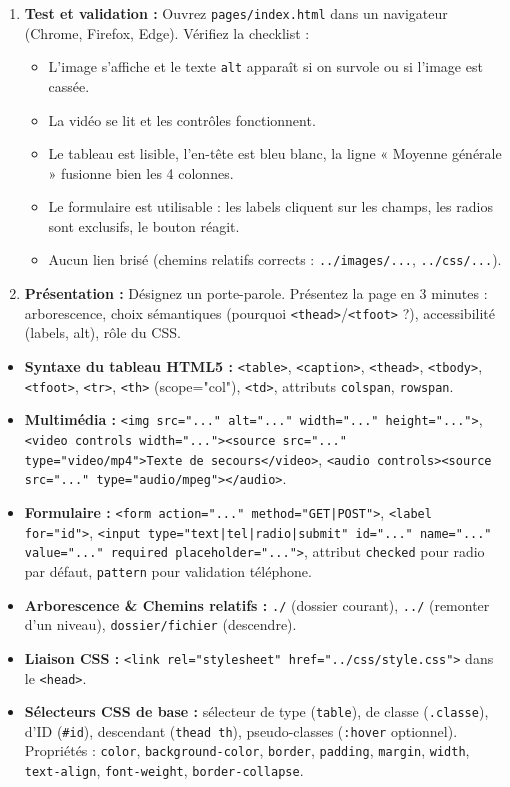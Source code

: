 \documentclass[11pt]{article}
\newcounter{popsec}
\newcounter{popsub}
\newcommand{\courssub}[1]{%
  \stepcounter{popsub}%
  \par\vspace{9pt}\noindent{\popxbold\fontsize{11.5}{13}\selectfont\color{popink}{\color{poporange}\thepopsec.\thepopsub}\hspace{6pt}#1}\par\nopagebreak\vspace{4pt}
}
\begin{document}
\begin{enumerate}
    \item \textbf{Test et validation :} Ouvrez \texttt{pages/index.html} dans un navigateur (Chrome, Firefox, Edge). Vérifiez la checklist :
    \begin{itemize}
        \item L'image s'affiche et le texte \texttt{alt} apparaît si on survole ou si l'image est cassée.
        \item La vidéo se lit et les contrôles fonctionnent.
        \item Le tableau est lisible, l'en-tête est bleu blanc, la ligne « Moyenne générale » fusionne bien les 4 colonnes.
        \item Le formulaire est utilisable : les labels cliquent sur les champs, les radios sont exclusifs, le bouton réagit.
        \item Aucun lien brisé (chemins relatifs corrects : \texttt{../images/...}, \texttt{../css/...}).
    \end{itemize}
    \item \textbf{Présentation :} Désignez un porte-parole. Présentez la page en 3 minutes : arborescence, choix sémantiques (pourquoi \texttt{<thead>}/\texttt{<tfoot>} ?), accessibilité (labels, alt), rôle du CSS.
\end{enumerate}

\courssub{Ressources à mobiliser}
\begin{itemize}
    \item \textbf{Syntaxe du tableau HTML5 :} \texttt{<table>}, \texttt{<caption>}, \texttt{<thead>}, \texttt{<tbody>}, \texttt{<tfoot>}, \texttt{<tr>}, \texttt{<th>} (scope="col"), \texttt{<td>}, attributs \texttt{colspan}, \texttt{rowspan}.
    \item \textbf{Multimédia :} \texttt{<img src="..." alt="..." width="..." height="...">}, \texttt{<video controls width="..."><source src="..." type="video/mp4">Texte de secours</video>}, \texttt{<audio controls><source src="..." type="audio/mpeg"></audio>}.
    \item \textbf{Formulaire :} \texttt{<form action="..." method="GET|POST">}, \texttt{<label for="id">}, \texttt{<input type="text|tel|radio|submit" id="..." name="..." value="..." required placeholder="...">}, attribut \texttt{checked} pour radio par défaut, \texttt{pattern} pour validation téléphone.
    \item \textbf{Arborescence \& Chemins relatifs :} \texttt{./} (dossier courant), \texttt{../} (remonter d'un niveau), \texttt{dossier/fichier} (descendre).
    \item \textbf{Liaison CSS :} \texttt{<link rel="stylesheet" href="../css/style.css">} dans le \texttt{<head>}.
    \item \textbf{Sélecteurs CSS de base :} sélecteur de type (\texttt{table}), de classe (\texttt{.classe}), d'ID (\texttt{\#id}), descendant (\texttt{thead th}), pseudo-classes (\texttt{:hover} optionnel). Propriétés : \texttt{color}, \texttt{background-color}, \texttt{border}, \texttt{padding}, \texttt{margin}, \texttt{width}, \texttt{text-align}, \texttt{font-weight}, \texttt{border-collapse}.
\end{itemize}
\end{document}
